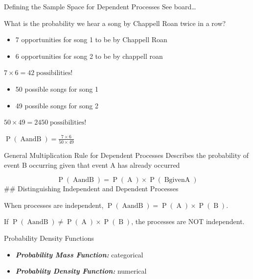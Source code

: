 \documentclass[
  ignorenonframetext,
]{beamer}
\begin{document}
\begin{frame}{Defining the Sample Space for Dependent Processes}
\label{defining-the-sample-space-for-dependent-processes}
See board\ldots{}
\end{frame}

\begin{frame}{What is the probability we hear a song by Chappell Roan
twice in a row?}
\label{what-is-the-probability-we-hear-a-song-by-chappell-roan-twice-in-a-row-1}
\begin{itemize}
\item
  7 opportunities for song 1 to be by Chappell Roan
\item
  6 opportunities for song 2 to be by chappell roan
\end{itemize}

\(7 \times 6 = 42 \operatorname{possibilities!}\)

\begin{itemize}
\item
  50 possible songs for song 1
\item
  49 possible songs for song 2
\end{itemize}

\(50 \times 49 = 2450 \operatorname{possibilities!}\)

\(\operatorname{P}(\operatorname{A and B})=\frac{7 \times 6}{50 \times 49}\)
\end{frame}

\begin{frame}{General Multiplication Rule for Dependent Processes}
\label{general-multiplication-rule-for-dependent-processes}
Describes the probability of event B occurring given that event A has
already occurred

\[
\operatorname{P}(\operatorname{A and B})=\operatorname{P}(\operatorname{A}) \times \operatorname{P}(\operatorname{B given A})
\] \#\# Distinguishing Independent and Dependent Processes

When processes are independent,
\(\operatorname{P}(\operatorname{A and B})=\operatorname{P}(\operatorname{A}) \times \operatorname{P}(\operatorname{B})\).

If
\(\operatorname{P}(\operatorname{A and B})\ne\operatorname{P}(\operatorname{A}) \times \operatorname{P}(\operatorname{B})\),
the processes are NOT independent.
\end{frame}

\begin{frame}{Probability Density Functions}
\label{probability-density-functions}
\begin{itemize}
\item
  \textbf{\emph{Probability Mass Function:}} categorical
\item
  \textbf{\emph{Probabiity Density Function:}} numerical
\end{itemize}
\end{frame}
\end{document}
